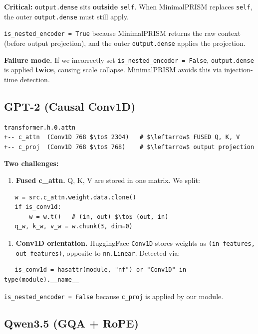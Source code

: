 \textbf{Critical:} \texttt{output.dense} sits \textbf{outside} \texttt{self}. When MinimalPRISM 
replaces \texttt{self}, the outer \texttt{output.dense} must still apply.

\texttt{is\_nested\_encoder = True} because MinimalPRISM returns the raw context 
(before output projection), and the outer \texttt{output.dense} applies the 
projection.

\textbf{Failure mode.} If we incorrectly set \texttt{is\_nested\_encoder = False}, 
\texttt{output.dense} is applied \textbf{twice}, causing scale collapse. MinimalPRISM 
avoids this via injection-time detection.

\subsection{GPT-2 (Causal Conv1D)}

\begin{lstlisting}
transformer.h.0.attn
+-- c_attn  (Conv1D 768 $\to$ 2304)   # $\leftarrow$ FUSED Q, K, V
+-- c_proj  (Conv1D 768 $\to$ 768)    # $\leftarrow$ output projection
\end{lstlisting}

\textbf{Two challenges:}

\begin{enumerate}
\item \textbf{Fused c\_attn.} Q, K, V are stored in one matrix. We split:
\end{enumerate}
\begin{lstlisting}
   w = src.c_attn.weight.data.clone()
   if is_conv1d:
       w = w.t()   # (in, out) $\to$ (out, in)
   q_w, k_w, v_w = w.chunk(3, dim=0)
\end{lstlisting}

\begin{enumerate}
\item \textbf{Conv1D orientation.} HuggingFace \texttt{Conv1D} stores weights as
  \texttt{(in\_features, out\_features)}, opposite to \texttt{nn.Linear}. Detected via:
\end{enumerate}
\begin{lstlisting}
   is_conv1d = hasattr(module, "nf") or "Conv1D" in type(module).__name__
\end{lstlisting}

\texttt{is\_nested\_encoder = False} because \texttt{c\_proj} is applied by our module.

\subsection{Qwen3.5 (GQA + RoPE)}

